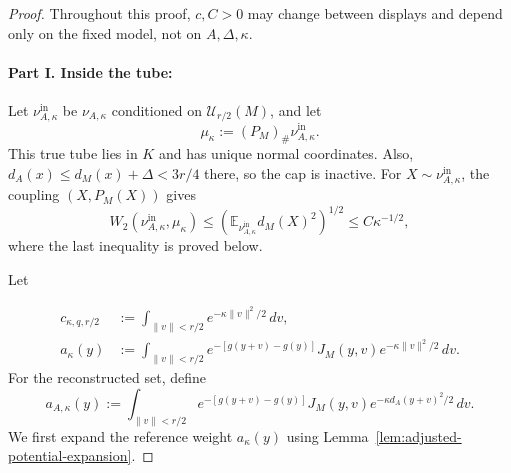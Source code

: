 \documentclass{article}
\newcommand{\E}{\mathbb E}
\newcommand{\cU}{\mathcal U}
\numberwithin{equation}{section}
\begin{document}
\begin{proof}
Throughout this proof, $c,C>0$ may change between displays and depend
only on the fixed model, not on $A,\Delta,\kappa$.

\paragraph{Part I. Inside the tube:}
Let $\nu_{A,\kappa}^{\mathrm{in}}$ be $\nu_{A,\kappa}$ conditioned on
$\cU_{r/2}(M)$, and let
\[
 \mu_\kappa:=(P_M)_\#\nu_{A,\kappa}^{\mathrm{in}}.
\]
This true tube lies in $K$ and has unique normal coordinates.
Also, $d_A(x)\le d_M(x)+\Delta<3r/4$ there, so the cap is inactive.
For $X\sim\nu_{A,\kappa}^{\mathrm{in}}$, the coupling $(X,P_M(X))$ gives
\begin{equation}
 W_2(\nu_{A,\kappa}^{\mathrm{in}},\mu_\kappa)
 \le
 \left(\E_{\nu_{A,\kappa}^{\mathrm{in}}}d_M(X)^2\right)^{1/2}
 \le C\kappa^{-1/2},
\label{eq:projection-coupling}
\end{equation}
where the last inequality is proved below.

Let

\begin{align}
 c_{\kappa,q,r/2}
 &:=\int_{\lVert v\rVert<r/2}
       e^{-\kappa\lVert v\rVert^2/2}\,dv,\label{eq:c-kappa}\\
 a_\kappa(y)
 &:=\int_{\lVert v\rVert<r/2}
 e^{-[g(y+v)-g(y)]}J_M(y,v)
 e^{-\kappa\lVert v\rVert^2/2}\,dv.
\label{eq:fiber-weight}
\end{align}
For the reconstructed set, define
\begin{equation}
 a_{A,\kappa}(y)
 :=\int_{\lVert v\rVert<r/2}
 e^{-[g(y+v)-g(y)]}J_M(y,v)
 e^{-\kappa d_A(y+v)^2/2}\,dv.
\label{eq:estimated-fiber-weight}
\end{equation}
We first expand the reference weight $a_\kappa(y)$ using
Lemma~\ref{lem:adjusted-potential-expansion}.


\end{proof}
\end{document}

